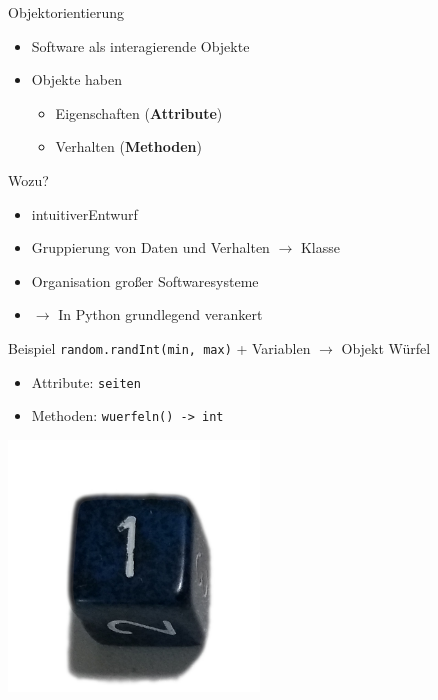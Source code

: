 \begin{frame}{\glqq Objektorientierung\grqq}
    \begin{itemize}
        \item Software als interagierende \glqq Objekte\grqq
        \item Objekte haben 
        \begin{itemize}
            \item Eigenschaften (\textbf{Attribute})
            \item Verhalten (\textbf{Methoden})
        \end{itemize}
    \end{itemize}
\end{frame}
\begin{frame}{Wozu?}
    \begin{itemize}
        \item \glqq intuitiver\grqq Entwurf
        \item Gruppierung von Daten und Verhalten $\rightarrow$ Klasse 
        \item Organisation großer Softwaresysteme
        \item $\rightarrow$ In Python grundlegend verankert
    \end{itemize}
\end{frame}
\begin{frame}{Beispiel}
    \texttt{random.randInt(min, max)} + Variablen $\rightarrow$ Objekt \glqq Würfel\grqq \begin{itemize}
        \item Attribute: \texttt{seiten}
        \item Methoden: \texttt{wuerfeln() -> int}
    \end{itemize}
    \begin{center}
        \includegraphics[width=0.5\textwidth]{d6.jpg}
    \end{center}
\end{frame}
